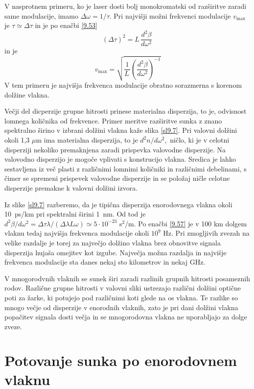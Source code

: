 \documentclass[11pt,fleqn]{book} %
\begin{document}
V nasprotnem primeru, ko je laser dosti bolj monokromatski od razširitve
zaradi same modulacije, imamo $\Delta\omega=1/\tau$. Pri najvišji
možni frekvenci modulacije $v_{\max}$ je $\tau\simeq\Delta\tau$
in je po enačbi \ref{9.53} 
\begin{equation}
(\Delta\tau)^{2}=L\,\frac{d^{2}\beta}{d\omega^{2}}\,\label{9.56}
\end{equation}
 in je 
\begin{equation}
v_{\max}=\sqrt{\frac{1}{L\,}\left(\frac{d^{2}\beta}{d\omega^{2}}\right)^{-1}}\label{9.57}
\end{equation}
 V tem primeru je najvišja frekvenca modulacije obratno sorazmerna
s korenom dolžine vlakna.

Večji del dicperzije grupne hitrosti prinese materialna disperzija,
to je, odvisnost lomnega količnika od frekvence. Primer meritve razširitve
sunka z znano spektralno širino v izbrani dolžini vlakna kaže slika
\ref{sl9.7}. Pri valovni dolžini okoli 1,3 $\mu$m ima materialna
disperzija, to je $d^{2}n/d\omega^{2},$ ničlo, ki je v celotni disperziji
nekoliko premaknjena zaradi prispevka valovodne disperzije. Na valovodno
disperzijo je mogoče vplivati s konstrucijo vlakna. Sredica je lahko
sestavljena iz več plasti z različnimi lomnimi količniki in različnimi
debelinami, s čimer se spremeni prispevek valovodne disperzije in
se položaj ničle celotne disperzije premakne k valovni dolžini izvora.

Iz slike \ref{sl9.7} razberemo, da je tipična disperzija enorodovnega
vlakna okoli 10~ps/km pri spektralni širini 1~nm. Od tod je $d^{2}\beta/d\omega^{2}=\Delta\tau\lambda/\left(\Delta\lambda L\omega\right)\simeq5\cdot10^{-23}$
s$^{2}/$m. Po enačbi \ref{9.57} je v 100 km dolgem vlaknu tedaj
najvišja frekvenca modulacije okoli $10^{9}$ Hz. Pri zmogljivih zvezah
na velike razdalje je torej za največjo dolžino vlakna brez obnovitve
signala disperzija hujaša omejitev kot izgube. Največja možna razdalja
in najvišje frekvenca modulacije sta danes nekaj sto kilometrov in
nekaj GHz.

V mnogorodvnih vlaknih se sunek širi zaradi razli\textquotedbl{}nih
grupnih hitrosti posameznih rodov. Različne grupne hitrosti v valovni
sliki ustrezajo različni dolžini optične poti za žarke, ki potujejo
pod različnimi koti glede na os vlakna. Te razlike so mnogo večje
od disperzije v enorodnih vlaknih, zato je pri dani dolžini vlakna
popačitev signala dosti večja in se mnogorodovna vlakna ne uporabljajo
za dolge zveze.


\section{ Potovanje sunka po enorodovnem vlaknu}
\end{document}
